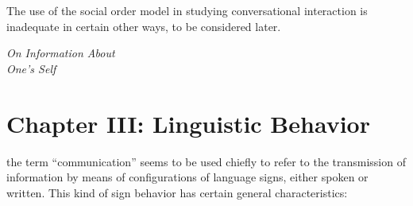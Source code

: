 \documentclass[twoside,symmetric,nobib,justified]{tufte-book}
\let\oldchapter\chapter
\def\chapter{%
  \setcounter{footnote}{0}%
  \oldchapter
}
\begin{document}
The use of the social order model in studying conversational interaction
is inadequate in certain other ways, to be considered later.

\newpage
\thispagestyle{plain} %
\mbox{}


\newpage
\thispagestyle{empty}
\begin{fullwidth}

\begin{center}
\vspace*{3in}

{\fontsize{35}{24}\selectfont{Part Three}\par}

\vspace{1in}

{\fontsize{35}{24}\selectfont\textit{On Information About\\ One’s Self}\par}

\end{center}

\end{fullwidth}

\chapter[CHAPTER III: LINGUISTIC BEHAVIOR]{Chapter III: Linguistic Behavior}
\label{ch:Chapter III: Linguistic Behavior}

 the term ``communication'' seems to be used
chiefly to refer to the transmission of information by means of
configurations of language signs, either spoken or written. This kind of
sign behavior has certain general characteristics:
\end{document}

